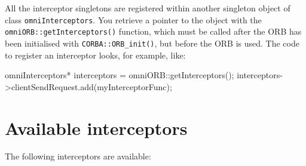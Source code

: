 \documentclass[11pt,twoside,a4paper]{book}
\newcommand{\code}[1]{\texttt{#1}}
\newcommand{\op}[1]{\texttt{#1()}}
\newcommand{\dsc}{\discretionary{}{}{}}
\begin{document}
All the interceptor singletons are registered within another singleton
object of class \code{omniInterceptors}. You retrieve a pointer to the
object with the \op{omniORB::\dsc{}getInterceptors} function, which
must be called after the ORB has been initialised with
\op{CORBA::ORB\_init}, but before the ORB is used. The code to
register an interceptor looks, for example, like:

\begin{cxxlisting}
omniInterceptors* interceptors = omniORB::getInterceptors();
interceptors->clientSendRequest.add(myInterceptorFunc);
\end{cxxlisting}


\section{Available interceptors}

The following interceptors are available:
\end{document}
